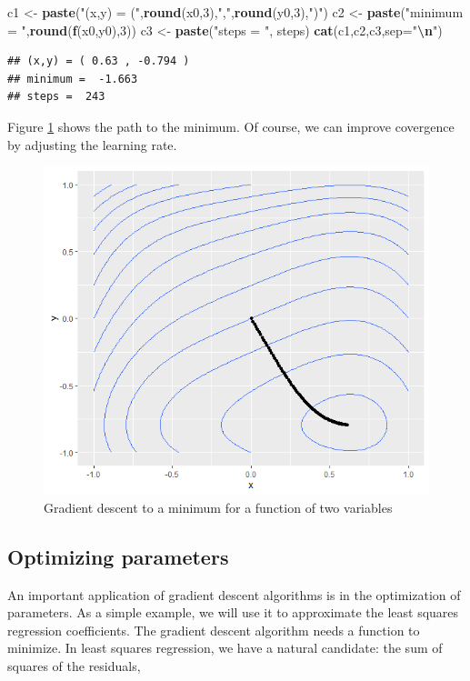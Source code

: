 \documentclass[
]{book}
\newenvironment{Shaded}{\begin{snugshade}}{\end{snugshade}}
\newcommand{\AttributeTok}[1]{\textcolor[rgb]{0.13,0.29,0.53}{#1}}
\newcommand{\DecValTok}[1]{\textcolor[rgb]{0.00,0.00,0.81}{#1}}
\newcommand{\FunctionTok}[1]{\textcolor[rgb]{0.13,0.29,0.53}{\textbf{#1}}}
\newcommand{\NormalTok}[1]{#1}
\newcommand{\OtherTok}[1]{\textcolor[rgb]{0.56,0.35,0.01}{#1}}
\newcommand{\SpecialCharTok}[1]{\textcolor[rgb]{0.81,0.36,0.00}{\textbf{#1}}}
\newcommand{\StringTok}[1]{\textcolor[rgb]{0.31,0.60,0.02}{#1}}
\theoremstyle{definition}
\theoremstyle{definition}
\theoremstyle{definition}
\theoremstyle{definition}
\theoremstyle{remark}
\begin{document}
\begin{Shaded}
\begin{Highlighting}[]
\NormalTok{c1 }\OtherTok{\textless{}{-}} \FunctionTok{paste}\NormalTok{(}\StringTok{"(x,y) = ("}\NormalTok{,}\FunctionTok{round}\NormalTok{(x0,}\DecValTok{3}\NormalTok{),}\StringTok{","}\NormalTok{,}\FunctionTok{round}\NormalTok{(y0,}\DecValTok{3}\NormalTok{),}\StringTok{")"}\NormalTok{)}
\NormalTok{c2 }\OtherTok{\textless{}{-}} \FunctionTok{paste}\NormalTok{(}\StringTok{"minimum = "}\NormalTok{,}\FunctionTok{round}\NormalTok{(}\FunctionTok{f}\NormalTok{(x0,y0),}\DecValTok{3}\NormalTok{))}
\NormalTok{c3 }\OtherTok{\textless{}{-}} \FunctionTok{paste}\NormalTok{(}\StringTok{"steps = "}\NormalTok{, steps)}
\FunctionTok{cat}\NormalTok{(c1,c2,c3,}\AttributeTok{sep=}\StringTok{"}\SpecialCharTok{\textbackslash{}n}\StringTok{"}\NormalTok{)}
\end{Highlighting}
\end{Shaded}

\begin{verbatim}
## (x,y) = ( 0.63 , -0.794 )
## minimum =  -1.663
## steps =  243
\end{verbatim}

Figure \ref{fig:GD9} shows the path to the minimum. Of course, we can improve covergence by adjusting the learning rate.

\begin{figure}

{\centering \includegraphics[width=0.5\linewidth]{images/gd11} 

}

\caption{Gradient descent to a minimum for a function of two variables}\label{fig:GD9}
\end{figure}

\subsection*{Optimizing parameters}\label{optimizing-parameters}

An important application of gradient descent algorithms is in the optimization of parameters. As a simple example, we will use it to approximate the least squares regression coefficients. The gradient descent algorithm needs a function to minimize. In least squares regression, we have a natural candidate: the sum of squares of the residuals,
\end{document}
